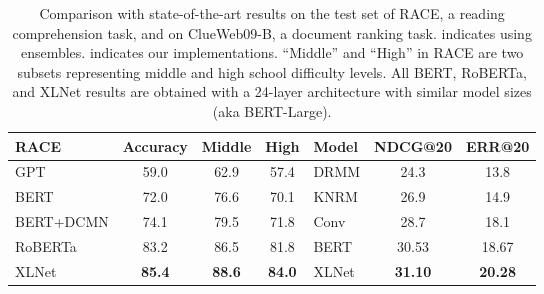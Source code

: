 \documentclass{article}
\begin{document}
\begin{table}[!h]
	\small
	\centering
	\begin{tabular}{lccc|lcc}
		\toprule
		\bf RACE & \bf Accuracy & \bf Middle & \bf High & \bf Model & \bf NDCG@20 & \bf ERR@20 \\
		\midrule
		GPT \cite{radford2018improving} & 59.0 & 62.9 & 57.4 & DRMM \cite{guo2016deep} & 24.3 & 13.8 \\
		BERT \cite{pan2019improving} & 72.0 & 76.6 & 70.1 & KNRM \cite{dai2018convolutional} & 26.9 & 14.9 \\
BERT+DCMN \cite{zhang2019dual} & 74.1 & 79.5 & 71.8 & Conv \cite{dai2018convolutional} & 28.7 & 18.1 \\
		RoBERTa \cite{liu2019roberta} & 83.2 & 86.5 & 81.8 & BERT & 30.53 & 18.67 \\
		\midrule
		XLNet & \bf 85.4 & \bf 88.6 & \bf 84.0 & XLNet & \bf 31.10 & \bf 20.28 \\
		\bottomrule
	\end{tabular}
	\caption{\small
		Comparison with state-of-the-art results on the test set of RACE, a reading comprehension task, and on ClueWeb09-B, a document ranking task.  indicates using ensembles.  indicates our implementations. ``Middle'' and ``High'' in RACE are two subsets representing middle and high school difficulty levels. All BERT, RoBERTa, and XLNet results are obtained with a 24-layer architecture with similar model sizes (aka BERT-Large).
	}
	\label{tab:race}
\end{table}
\end{document}
